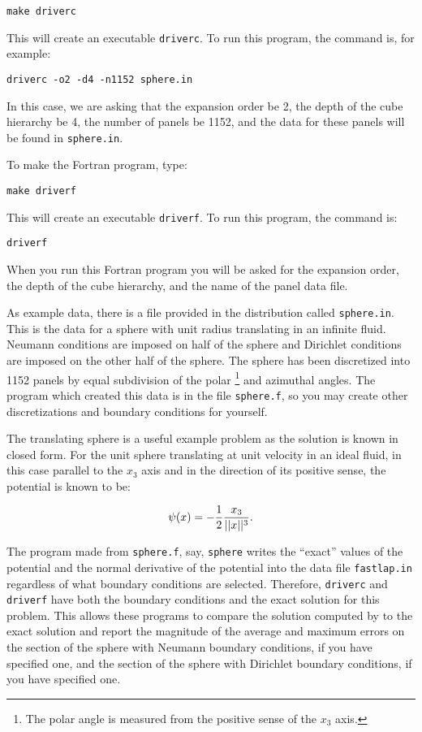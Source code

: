 {\tt make driverc}

\noindent
This will create an executable {\tt driverc}.  To run this program, the
command is, for example:

{\tt driverc -o2 -d4 -n1152 sphere.in}

\noindent
In this case, we are asking that the expansion order be 2, the depth
of the cube hierarchy be 4, the number of panels be 1152, and the data
for these panels will be found in {\tt sphere.in}.  

To make the Fortran program, type:

{\tt make driverf}

\noindent
This will create an executable {\tt driverf}.  To run this program, the
command is:

{\tt driverf}

\noindent
When you run this Fortran program you will be asked for 
the expansion order, the depth of the cube hierarchy, and the name of 
the panel data file.

As example data, there is a file provided in the distribution called 
{\tt sphere.in}.  This is the data for a sphere with unit radius translating
in an infinite fluid.  Neumann conditions are imposed on half of the
sphere and Dirichlet conditions are imposed on the other half of the
sphere.  The sphere has been discretized into 1152 panels by equal 
subdivision of the polar \footnote {The polar angle is measured from
the positive sense of the $x_3$ axis.}
and azimuthal angles.  The program which 
created this data is in the file {\tt sphere.f}, so you may create
other discretizations and boundary conditions for yourself.  

The translating sphere is a useful example problem as the solution is
known in closed form.  For the unit sphere translating at unit velocity 
in an ideal fluid, in this case parallel to the $x_3$ axis and in the 
direction of its positive sense, the potential is known to be:

\begin{equation}
\psi(x) = - {1 \over 2} {x_3 \over ||x||^3}.
\label{eq:psisphere}
\end{equation}

\noindent
The program made from {\tt sphere.f}, say, {\tt sphere}  writes the ``exact'' 
values of the potential and the normal
derivative of the potential into the data file {\tt fastlap.in} regardless
of what boundary conditions are selected.  Therefore, {\tt driverc} and
{\tt driverf} have both the boundary conditions and the exact solution 
for this problem.  This allows these programs to compare the solution 
computed by \fas to the exact solution and report the magnitude of the 
average and maximum errors on the section of the sphere with Neumann
boundary conditions, if you have specified one, and the section of the 
sphere with Dirichlet boundary conditions, if you have specified one.

